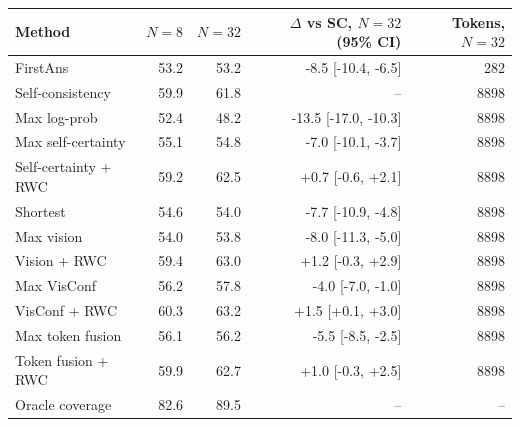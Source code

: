 \begin{tabular}{lrrrr}
\toprule
Method & $N{=}8$ & $N{=}32$ & $\Delta$ vs SC, $N{=}32$ (95\% CI) & Tokens, $N{=}32$ \\
\midrule
FirstAns & 53.2 & 53.2 & -8.5 [-10.4, -6.5] & 282 \\
Self-consistency & 59.9 & 61.8 & -- & 8898 \\
Max log-prob & 52.4 & 48.2 & -13.5 [-17.0, -10.3] & 8898 \\
Max self-certainty & 55.1 & 54.8 & -7.0 [-10.1, -3.7] & 8898 \\
Self-certainty + RWC & 59.2 & 62.5 & +0.7 [-0.6, +2.1] & 8898 \\
Shortest & 54.6 & 54.0 & -7.7 [-10.9, -4.8] & 8898 \\
Max vision & 54.0 & 53.8 & -8.0 [-11.3, -5.0] & 8898 \\
Vision + RWC & 59.4 & 63.0 & +1.2 [-0.3, +2.9] & 8898 \\
Max VisConf & 56.2 & 57.8 & -4.0 [-7.0, -1.0] & 8898 \\
VisConf + RWC & 60.3 & 63.2 & +1.5 [+0.1, +3.0] & 8898 \\
Max token fusion & 56.1 & 56.2 & -5.5 [-8.5, -2.5] & 8898 \\
Token fusion + RWC & 59.9 & 62.7 & +1.0 [-0.3, +2.5] & 8898 \\
\midrule
Oracle coverage & 82.6 & 89.5 & -- & -- \\
\bottomrule
\end{tabular}
